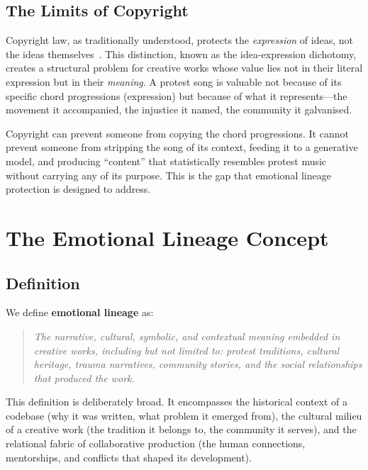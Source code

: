 \documentclass[11pt,twocolumn]{article}
\begin{document}
\subsection{The Limits of Copyright}

Copyright law, as traditionally understood, protects the \emph{expression}
of ideas, not the ideas themselves~\cite{samuelson1984copyright}.
This distinction, known as the idea-expression dichotomy, creates a
structural problem for creative works whose value lies not in their
literal expression but in their \emph{meaning}. A protest song is
valuable not because of its specific chord progressions (expression) but
because of what it represents---the movement it accompanied, the
injustice it named, the community it galvanised.

Copyright can prevent someone from copying the chord progressions. It
cannot prevent someone from stripping the song of its context, feeding
it to a generative model, and producing ``content'' that
statistically resembles protest music without carrying any of its
purpose. This is the gap that emotional lineage protection is designed
to address.

\section{The Emotional Lineage Concept}
\label{sec:emotional-lineage}

\subsection{Definition}

We define \textbf{emotional lineage} as:

\begin{quote}
\textit{The narrative, cultural, symbolic, and contextual meaning embedded
in creative works, including but not limited to: protest traditions,
cultural heritage, trauma narratives, community stories, and the social
relationships that produced the work.}
\end{quote}

This definition is deliberately broad. It encompasses the historical
context of a codebase (why it was written, what problem it emerged from),
the cultural milieu of a creative work (the tradition it belongs to, the
community it serves), and the relational fabric of collaborative
production (the human connections, mentorships, and conflicts that shaped
its development).
\end{document}
